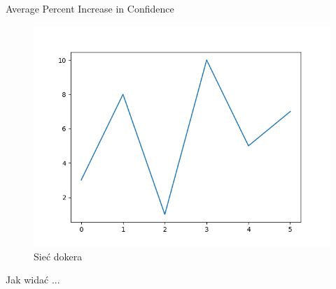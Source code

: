 Average Percent Increase in Confidence
\begin{figure}
	\centering\includegraphics[width=.6\textwidth]{images/example}
	\caption{Sieć dokera \cite{docker_compose_reference}}  \label{rys:network}
\end{figure}

Jak widać ...
